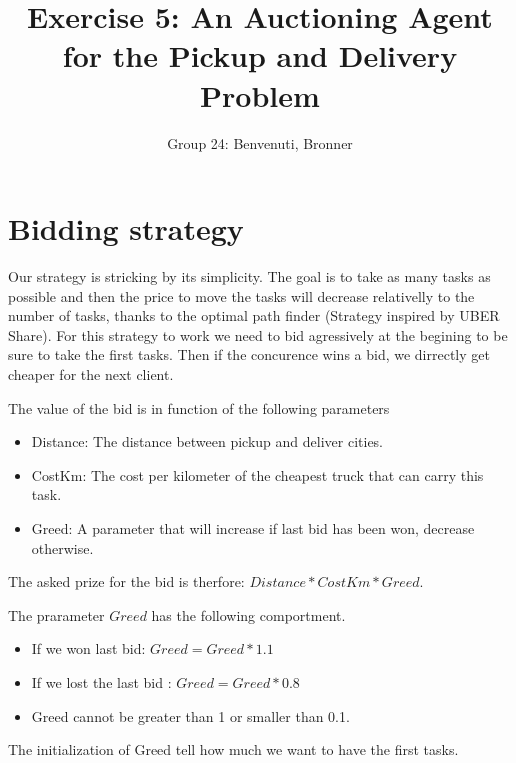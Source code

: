 \documentclass[11pt]{article}
\title{\bf Exercise 5: An Auctioning Agent for the Pickup and Delivery Problem}
\author{Group 24: Benvenuti, Bronner}
\begin{document}
\maketitle

\section{Bidding strategy}
Our strategy is stricking by its simplicity. The goal is to take as many tasks as possible and then the price to move the tasks will decrease relativelly to the number of tasks, thanks to the optimal path finder (Strategy inspired by UBER Share). For this strategy to work we need to bid agressively at the begining to be sure to take the first tasks. Then if the concurence wins a bid, we dirrectly get cheaper for the next client.

The value of the bid is in function of the following parameters
\begin{itemize}
  \item Distance: The distance between pickup and deliver cities.
  \item CostKm: The cost per kilometer of the cheapest truck that can carry this task.
  \item Greed: A parameter that will increase if last bid has been won, decrease otherwise. 
\end{itemize}

The asked prize for the bid is therfore: $Distance * CostKm * Greed$. 

The prarameter $Greed$ has the following comportment.
\begin{itemize}
  \item If we won last bid: $Greed = Greed * 1.1$
  \item If we lost the last bid : $Greed = Greed * 0.8$
  \item Greed cannot be greater than 1 or smaller than 0.1.
\end{itemize}
The initialization of Greed tell how much we want to have the first tasks. 
\end{document}
